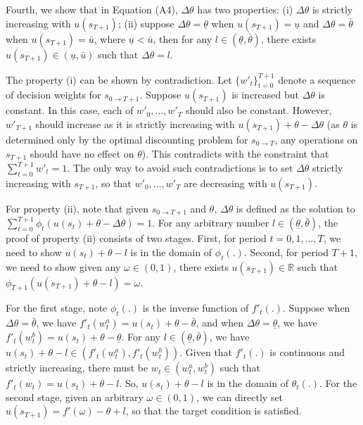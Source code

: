\documentclass[
  12pt,
]{article}
\begin{document}
Fourth, we show that in Equation (A4), \(\Delta \theta\) has two
properties: (i) \(\Delta \theta\) is strictly increasing with
\(u(s_{T+1})\); (ii) suppose \(\Delta \theta = \underline{\theta}\) when
\(u(s_{T+1})=\underline{u}\) and \(\Delta\theta=\bar{\theta}\) when
\(u(s_{T+1})=\bar{u}\), where \(\underline{u}<\bar{u}\), then for any
\(l \in(\underline{\theta},\bar{\theta})\), there exists
\(u(s_{T+1})\in(\underline{u},\bar{u})\) such that
\(\Delta \theta = l\).

The property (i) can be shown by contradiction. Let
\(\{w'_t\}_{t=0}^{T+1}\) denote a sequence of decision weights for
\(s_{0\rightarrow T+1}\). Suppose \(u(s_{T+1})\) is increased but
\(\Delta \theta\) is constant. In this case, each of \(w'_0,…,w'_T\)
should also be constant. However, \(w'_{T+1}\) should increase as it is
strictly increasing with \(u(s_{T+1})+\theta-\Delta \theta\) (as
\(\theta\) is determined only by the optimal discounting problem for
\(s_{0\rightarrow T}\), any operations on \(s_{T+1}\) should have no
effect on \(\theta\)). This contradicts with the constraint that
\(\sum_{t=0}^{T+1} w'_t =1\). The only way to avoid such contradictions
is to set \(\Delta \theta\) strictly increasing with \(s_{T+1}\), so
that \(w'_0,…,w'_T\) are decreasing with \(u(s_{T+1})\).

For property (ii), note that given \(s_{0\rightarrow T+1}\) and
\(\theta\), \(\Delta\theta\) is defined as the solution to
\(\sum_{t=0}^{T+1} \phi_t(u(s_t)+\theta-\Delta\theta)=1\). For any
arbitrary number \(l\in(\underline{\theta},\bar{\theta})\), the proof of
property (ii) consists of two stages. First, for period \(t=0,1,…,T\),
we need to show \(u(s_t)+\theta-l\) is in the domain of \(\phi_t(.)\).
Second, for period \(T+1\), we need to show given any
\(\omega\in(0,1)\), there exists \(u(s_{T+1})\in \mathbb{R}\) such that
\(\phi_{T+1}(u(s_{T+1})+\theta-l)=\omega\).

For the first stage, note \(\phi_t(.)\) is the inverse function of
\(f'_t(.)\). Suppose when \(\Delta\theta=\bar{\theta}\), we have
\(f'_t(w^{a}_t)=u(s_t)+\theta-\bar{\theta}\), and when
\(\Delta\theta=\underline{\theta}\), we have
\(f'_t(w^{b}_t)=u(s_t)+\theta-\underline{\theta}\). For any
\(l\in(\underline{\theta},\bar{\theta})\), we have
\(u(s_t)+\theta-l \in (f'_t(w^a_t),f'_t(w^b_t))\). Given that
\(f'_t(.)\) is continuous and strictly increasing, there must be
\(w_t\in(w^a_t,w^b_t)\) such that \(f'_t(w_t)=u(s_t)+\theta-l\). So,
\(u(s_t)+\theta-l\) is in the domain of \(\theta_t(.)\). For the second
stage, given an arbitrary \(\omega\in(0,1)\), we can directly set
\(u(s_{T+1})=f'(\omega)-\theta+l\), so that the target condition is
satisfied.
\end{document}
